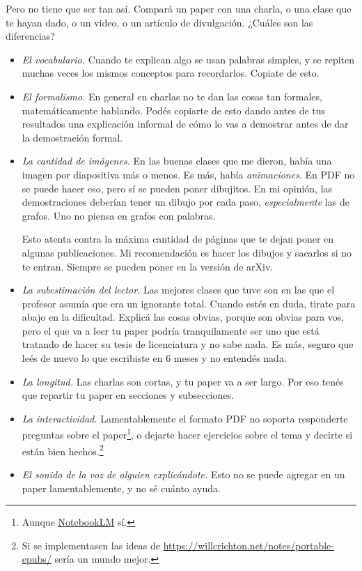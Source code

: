 \documentclass{article}
\begin{document}
Pero no tiene que ser tan así. Compará un paper con una charla, o una clase que te hayan dado, o un video, o un artículo de divulgación. ¿Cuáles son las diferencias?
\begin{itemize}
\item\emph{El vocabulario.} Cuando te explican algo se usan palabras simples, y se repiten muchas veces los mismos conceptos para recordarlos. Copiate de esto.
\item\emph{El formalismo.} En general en charlas no te dan las cosas tan formales, matemáticamente hablando. Podés copiarte de esto dando antes de tus resultados una explicación informal de cómo lo vas a demostrar antes de dar la demostración formal.   
\item\emph{La cantidad de imágenes.} En las buenas clases que me dieron, había una imagen por diapositiva más o menos. Es más, había \emph{animaciones}. En PDF no se puede hacer eso, pero sí se pueden poner dibujitos. En mi opinión, las demostraciones deberían tener un dibujo por cada paso, \emph{especialmente} las de grafos. Uno no piensa en grafos con palabras.

Esto atenta contra la máxima cantidad de páginas que te dejan poner en algunas publicaciones. Mi recomendación es hacer los dibujos y sacarlos si no te entran. Siempre se pueden poner en la versión de arXiv.
\item\emph{La subestimación del lector.} Las mejores clases que tuve son en las que el profesor asumía que era un ignorante total. Cuando estés en duda, tirate para abajo en la dificultad. Explicá las cosas obvias, porque son obvias para vos, pero el que va a leer tu paper podría tranquilamente ser uno que está tratando de hacer su tesis de licenciatura y no sabe nada. Es más, seguro que leés de nuevo lo que escribiste en 6 meses y no entendés nada.
\item\emph{La longitud.} Las charlas son cortas, y tu paper va a ser largo. Por eso tenés que repartir tu paper en secciones y subsecciones.
\item\emph{La interactividad.} Lamentablemente el formato PDF no soporta responderte preguntas sobre el paper\footnote{Aunque \href{https://notebooklm.google.com/}{NotebookLM} sí.}, o dejarte hacer ejercicios sobre el tema y decirte si están bien hechos.\footnote{Si se implementasen las ideas de \url{https://willcrichton.net/notes/portable-epubs/} sería un mundo mejor.}
\item\emph{El sonido de la voz de alguien explicándote.} Esto no se puede agregar en un paper lamentablemente, y no sé cuánto ayuda.
\end{itemize}
\end{document}
